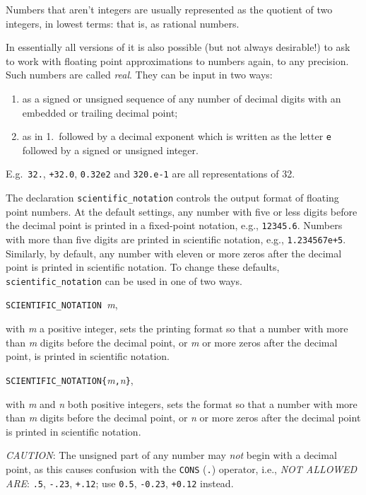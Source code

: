 Numbers that aren't integers are usually represented as the quotient of
two integers, in lowest terms: that is, as rational numbers.

In essentially all versions of {\REDUCE} it is also possible (but not always
desirable!) to ask {\REDUCE} to work with floating point approximations to
numbers again, to any precision. Such numbers are called \emph{real}.
  They can be input in two ways:
\begin{enumerate}
\item as a signed or unsigned sequence of any number of decimal digits
      with an embedded or trailing decimal point;
\item as in 1.\ followed by a decimal exponent which is written as the
      letter \texttt{e} followed by a signed or unsigned integer.
\end{enumerate}
E.g.\ \texttt{32.}, \texttt{+32.0}, \texttt{0.32e2} and
\texttt{320.e-1} are all representations of 32.

The declaration \texttt{scientific\_notation}
controls the output format of floating point numbers.  At
the default settings, any number with five or less digits before the
decimal point is printed in a fixed-point notation, e.g., \texttt{12345.6}.
Numbers with more than five digits are printed in scientific notation,
e.g., \texttt{1.234567e+5}.  Similarly, by default, any number with eleven or
more zeros after the decimal point is printed in scientific notation.  To
change these defaults, \texttt{scientific\_notation} can be used in one of two
ways.

\texttt{SCIENTIFIC\_NOTATION }\emph{m},

with \emph{m} a positive
integer, sets the printing format so that a number with more than \emph{m}
digits before the decimal point, or \emph{m} or more zeros after the
decimal point, is printed in scientific notation.

\texttt{SCIENTIFIC\_NOTATION\{}\emph{m}\texttt{,}\emph{n}\texttt{\}},

with \emph{m} and \emph{n} both positive integers, sets the
format so that a number with more than \emph{m} digits before the decimal
point, or \emph{n} or more zeros after the decimal point is printed in
scientific notation.

\textit{CAUTION}:  The unsigned part of any number may \emph{not}
begin with a decimal point, as this causes confusion with the \texttt{CONS} (\texttt{.})
operator, i.e., \emph{NOT ALLOWED ARE}: \texttt{.5}, \texttt{-.23}, \texttt{+.12};
use \texttt{0.5}, \texttt{-0.23}, \texttt{+0.12} instead.

